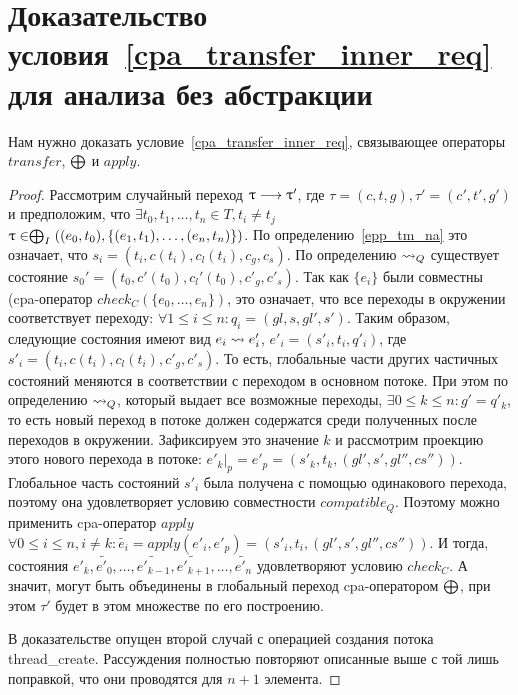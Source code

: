 \section{Доказательство условия~\ref{cpa_transfer_inner_req} для анализа без абстракции}
\label{sect_transfer_q_proof}

Нам нужно доказать условие~\ref{cpa_transfer_inner_req}, связывающее операторы $transfer$, $\mathrel{\bigoplus}$ и $apply$.
\begin{proof}

Рассмотрим случайный переход $\uptau \longrightarrow \uptau'$, где $\tau=(c,t,g), \tau' = (c',t',g')$ и предположим, что 
$\exists t_0, t_1, \dots, t_n \in T, t_i \neq t_j$ \\
$\uptau \in \mathrel{\bigoplus}_I((e_0,t_0), \{(e_1,t_1), \dots, (e_n, t_n)\})$.
По определению~\ref{epp_tm_na} это означает, что $s_i = (t_i, c(t_i),c_l(t_i), c_g,c_s)$. 
По определению $\leadsto_Q$ существует состояние $s_0' = (t_0, c'(t_0),c_l'(t_0), c'_g,c'_s)$.
Так как $\{e_i\}$ были совместны  (cpa-оператор $check_C(\{e_0,\dots,e_n\})$, это означает, что все переходы в окружении соответствует переходу: $\forall 1 \le i \le n: q_i = (gl, s, gl', s')$.
Таким образом, следующие состояния имеют вид $e_i \leadsto e'_i$, $e'_i = (s'_i, t_i, q'_i)$, где $s'_i = (t_i, c(t_i),c_l(t_i), c'_g,c'_s)$.
То есть, глобальные части других частичных состояний меняются в соответствии с переходом в основном потоке.
При этом по определению $\leadsto_Q$, который выдает все возможные переходы, $\exists 0 \le k \le n: g' = q'_k$, то есть новый переход в потоке должен содержатся среди полученных после переходов в окружении. 
Зафиксируем это значение $k$ и рассмотрим проекцию этого нового перехода в потоке: $e'_k|_p = e'_p = (s'_k, t_k, (gl', s', gl'', cs'')) $.
Глобальное часть состояний $s'_i$ была получена с помощью одинакового перехода, поэтому она удовлетворяет условию совместности $compatible_Q$. 
Поэтому можно применить cpa-оператор $apply$ $\forall 0 \le i \le n, i \neq k: \tilde{e_i} = apply(e'_i, e'_p) = (s'_i, t_i, (gl', s', gl'', cs''))$.
И тогда, состояния $e'_k, \tilde{e'_0}, \dots, \tilde{e'_{k-1}}, \tilde{e'_{k+1}}, \dots, \tilde{e'_n}$ удовлетворяют условию $check_C$. 
А значит, могут быть объединены в глобальный переход cpa-оператором $\mathrel{\bigoplus}$, при этом $\tau'$ будет в этом множестве по его построению.

В доказательстве опущен второй случай с операцией создания потока thread\_create. 
Рассуждения полностью повторяют описанные выше с той лишь поправкой, что они проводятся для $n+1$ элемента.
\end{proof}

